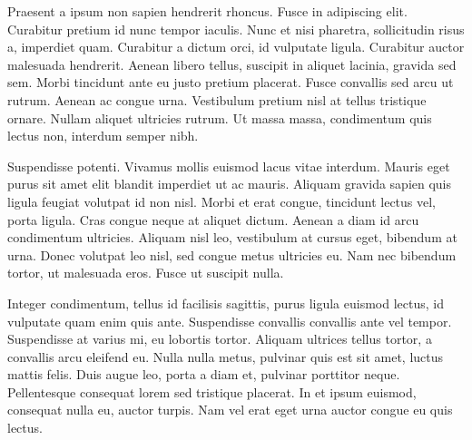 Praesent a ipsum non sapien hendrerit rhoncus. Fusce in adipiscing elit. Curabitur pretium id nunc tempor iaculis. Nunc et nisi pharetra, sollicitudin risus a, imperdiet quam. Curabitur a dictum orci, id vulputate ligula. Curabitur auctor malesuada hendrerit. Aenean libero tellus, suscipit in aliquet lacinia, gravida sed sem. Morbi tincidunt ante eu justo pretium placerat. Fusce convallis sed arcu ut rutrum. Aenean ac congue urna. Vestibulum pretium nisl at tellus tristique ornare. Nullam aliquet ultricies rutrum. Ut massa massa, condimentum quis lectus non, interdum semper nibh.

Suspendisse potenti. Vivamus mollis euismod lacus vitae interdum. Mauris eget purus sit amet elit blandit imperdiet ut ac mauris. Aliquam gravida sapien quis ligula feugiat volutpat id non nisl. Morbi et erat congue, tincidunt lectus vel, porta ligula. Cras congue neque at aliquet dictum. Aenean a diam id arcu condimentum ultricies. Aliquam nisl leo, vestibulum at cursus eget, bibendum at urna. Donec volutpat leo nisl, sed congue metus ultricies eu. Nam nec bibendum tortor, ut malesuada eros. Fusce ut suscipit nulla.

Integer condimentum, tellus id facilisis sagittis, purus ligula euismod lectus, id vulputate quam enim quis ante. Suspendisse convallis convallis ante vel tempor. Suspendisse at varius mi, eu lobortis tortor. Aliquam ultrices tellus tortor, a convallis arcu eleifend eu. Nulla nulla metus, pulvinar quis est sit amet, luctus mattis felis. Duis augue leo, porta a diam et, pulvinar porttitor neque. Pellentesque consequat lorem sed tristique placerat. In et ipsum euismod, consequat nulla eu, auctor turpis. Nam vel erat eget urna auctor congue eu quis lectus.
